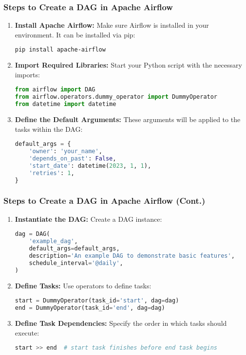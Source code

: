 \documentclass[aspectratio=169]{beamer}
\begin{document}
\begin{frame}[fragile]
    \frametitle{Steps to Create a DAG in Apache Airflow}
    \begin{enumerate}
        \item \textbf{Install Apache Airflow:} 
        Make sure Airflow is installed in your environment. It can be installed via pip:
        \begin{lstlisting}[language=bash]
pip install apache-airflow
        \end{lstlisting}
        
        \item \textbf{Import Required Libraries:} 
        Start your Python script with the necessary imports:
        \begin{lstlisting}[language=python]
from airflow import DAG
from airflow.operators.dummy_operator import DummyOperator
from datetime import datetime
        \end{lstlisting}
        
        \item \textbf{Define the Default Arguments:} 
        These arguments will be applied to the tasks within the DAG:
        \begin{lstlisting}[language=python]
default_args = {
    'owner': 'your_name',
    'depends_on_past': False,
    'start_date': datetime(2023, 1, 1),
    'retries': 1,
}
        \end{lstlisting}
    \end{enumerate}
\end{frame}

\begin{frame}[fragile]
    \frametitle{Steps to Create a DAG in Apache Airflow (Cont.)}
    \begin{enumerate}[start=4]
        \item \textbf{Instantiate the DAG:} 
        Create a DAG instance:
        \begin{lstlisting}[language=python]
dag = DAG(
    'example_dag',
    default_args=default_args,
    description='An example DAG to demonstrate basic features',
    schedule_interval='@daily',
)
        \end{lstlisting}

        \item \textbf{Define Tasks:} 
        Use operators to define tasks:
        \begin{lstlisting}[language=python]
start = DummyOperator(task_id='start', dag=dag)
end = DummyOperator(task_id='end', dag=dag)
        \end{lstlisting}

        \item \textbf{Define Task Dependencies:} 
        Specify the order in which tasks should execute:
        \begin{lstlisting}[language=python]
start >> end  # start task finishes before end task begins
        \end{lstlisting}
    \end{enumerate}
\end{frame}
\end{document}
